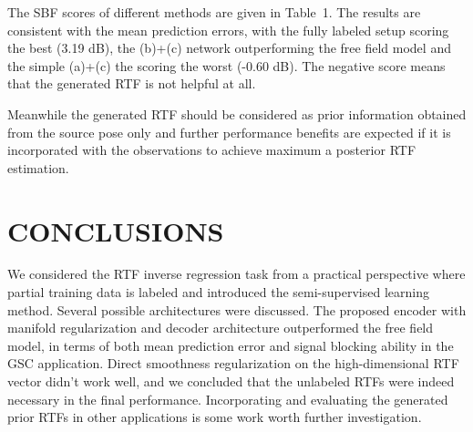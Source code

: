 \documentclass{article}
\begin{document}
The SBF scores of different methods are given in Table~1. The results are consistent with the mean prediction errors, with the fully labeled setup scoring the best (3.19 dB), the (b)+(c) network outperforming the free field model and the simple (a)+(c) the scoring the worst (-0.60 dB). The negative score means that the generated RTF is not helpful at all.

Meanwhile the generated RTF should be considered as prior information obtained from the source pose only and further performance benefits are expected if it is incorporated with the observations to achieve maximum a posterior RTF estimation.


\section{CONCLUSIONS}
\label{sec:con}

We considered the RTF inverse regression task from a practical perspective where partial training data is labeled and introduced the semi-supervised learning method. Several possible architectures were discussed. The proposed encoder with manifold regularization and decoder architecture outperformed the free field model, in terms of both mean prediction error and signal blocking ability in the GSC application. Direct smoothness regularization on the high-dimensional RTF vector didn't work well, and we concluded that the unlabeled RTFs were indeed necessary in the final performance. Incorporating and evaluating the generated prior RTFs in other applications is some work worth further investigation.


%
%
%
\end{document}
